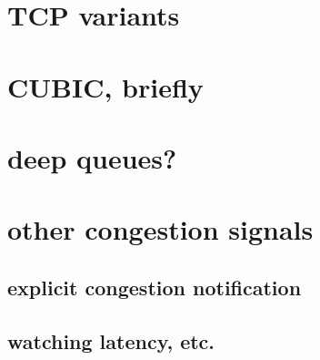 \section{TCP variants}


\section{CUBIC, briefly}



\section{deep queues?}


\section{other congestion signals}



\subsection{explicit congestion notification}


\subsection{watching latency, etc.}


